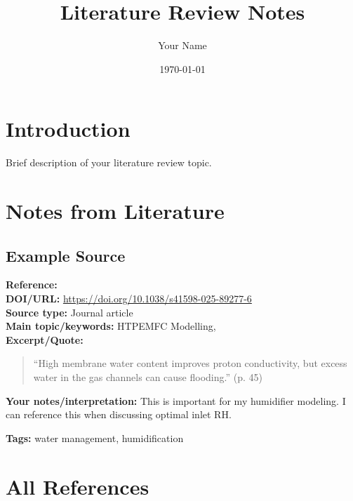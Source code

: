 \documentclass[12pt,a4paper]{article}
\title{Literature Review Notes}
\author{Your Name}
\date{\today}
\begin{document}
\maketitle
\tableofcontents
\newpage

\section{Introduction}
Brief description of your literature review topic.

\section{Notes from Literature}

\subsection{Example Source}
\textbf{Reference:} \cite{Samir2025} \\
\textbf{DOI/URL:} \url{https://doi.org/10.1038/s41598-025-89277-6} \\
\textbf{Source type:} Journal article \\
\textbf{Main topic/keywords:} HTPEMFC Modelling,  \\

\textbf{Excerpt/Quote:}
\begin{quote}
``High membrane water content improves proton conductivity, but excess water in the gas channels can cause flooding.'' (p. 45)
\end{quote}

\textbf{Your notes/interpretation:} This is important for my humidifier modeling. I can reference this when discussing optimal inlet RH.  

\textbf{Tags:} water management, humidification

\newpage
\section{All References}
\printbibliography
\end{document}

